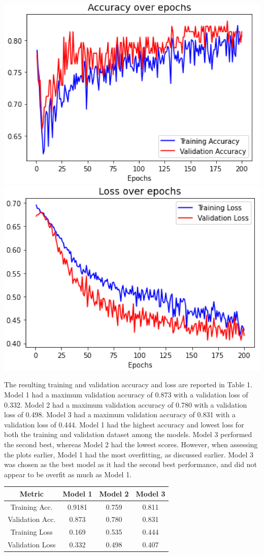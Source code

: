 \documentclass[10pt]{article}
\begin{document}
\begin{multicols}{2}
\begin{center}
\includegraphics[width=.4\textwidth]{Model3Acc}
\includegraphics[width=.4\textwidth]{Model3Loss}
\end{center}
The resulting training and validation accuracy and loss are reported in Table 1. Model 1 had a maximum validation accuracy of 0.873 with a validation loss of 0.332. Model 2 had a maximum validation accuracy of 0.780 with a validation loss of 0.498. Model 3 had a maximum validation accuracy of 0.831 with a validation loss of 0.444. Model 1 had the highest accuracy and lowest loss for both the training and validation dataset among the models. Model 3 performed the second best, whereas Model 2 had the lowest scores. However, when assessing the plots earlier, Model 1 had the most overfitting, as discussed earlier. Model 3 was chosen as the best model as it had the second best performance, and did not appear to be overfit as much as Model 1.

\begin{center}
\begin{tabular}{ |c||c|c|c|  }
 \hline
 Metric & Model 1 & Model 2 & Model 3\\
 \hline
 Training Acc. & 0.9181 & 0.759 & 0.811\\
 Validation Acc. & 0.873 & 0.780 & 0.831\\
 Training Loss & 0.169 & 0.535 & 0.444\\
 Validation Loss & 0.332 & 0.498 & 0.407\\
 \hline
\end{tabular}
\end{center}


\end{multicols}
\end{document}
